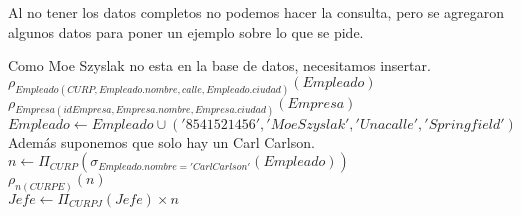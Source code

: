 \documentclass{article}
\begin{document}
\begin{enumerate}
\begin{enumerate}
				Al no tener los datos completos no podemos hacer la consulta, pero se agregaron algunos datos para poner un ejemplo sobre lo que se pide.
				
				Como Moe Szyslak no esta en la base de datos, necesitamos insertar.\\
				
				$\rho_{Empleado(CURP, Empleado.nombre, calle, Empleado.ciudad)}(Empleado)$\\
				$\rho_{Empresa(idEmpresa, Empresa.nombre, Empresa.ciudad)}(Empresa)$\\
				$Empleado \leftarrow Empleado \cup ('8541521456', 'Moe Szyslak', 'Una calle', 'Springfield')$\\
				
				Además suponemos que solo hay un Carl Carlson.\\
				
				$n \leftarrow \Pi_{CURP}(\sigma_{Empleado.nombre = 'Carl Carlson'}(Empleado))$\\
				$\rho_{n(CURPE)}(n)$\\
				$Jefe \leftarrow \Pi_{CURPJ}(Jefe) \times n$\\
													
			\end{enumerate}
	\end{enumerate}	
\end{document}
